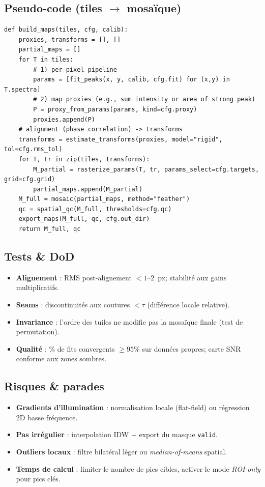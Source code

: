 \subsection{Pseudo-code (tiles $\rightarrow$ mosaïque)}
\begin{lstlisting}[basicstyle=\ttfamily\small]
def build_maps(tiles, cfg, calib):
    proxies, transforms = [], []
    partial_maps = []
    for T in tiles:
        # 1) per-pixel pipeline
        params = [fit_peaks(x, y, calib, cfg.fit) for (x,y) in T.spectra]
        # 2) map proxies (e.g., sum intensity or area of strong peak)
        P = proxy_from_params(params, kind=cfg.proxy)
        proxies.append(P)
    # alignment (phase correlation) -> transforms
    transforms = estimate_transforms(proxies, model="rigid", tol=cfg.rms_tol)
    for T, tr in zip(tiles, transforms):
        M_partial = rasterize_params(T, tr, params_select=cfg.targets, grid=cfg.grid)
        partial_maps.append(M_partial)
    M_full = mosaic(partial_maps, method="feather")
    qc = spatial_qc(M_full, thresholds=cfg.qc)
    export_maps(M_full, qc, cfg.out_dir)
    return M_full, qc
\end{lstlisting}

\subsection{Tests \& DoD}
\begin{itemize}[nosep]
\item \textbf{Alignement} : RMS post-alignement $< 1$--$2$~px; stabilité aux gains multiplicatifs.
\item \textbf{Seams} : discontinuités aux coutures $< \tau$ (différence locale relative).
\item \textbf{Invariance} : l'ordre des tuiles ne modifie pas la mosaïque finale (test de permutation).
\item \textbf{Qualité} : \% de fits convergents $\ge 95\%$ sur données propres; carte SNR conforme aux zones sombres.
\end{itemize}

\subsection{Risques \& parades}
\begin{itemize}[nosep]
\item \textbf{Gradients d'illumination} : normalisation locale (flat-field) ou régression 2D basse fréquence.
\item \textbf{Pas irrégulier} : interpolation IDW + export du masque \texttt{valid}.
\item \textbf{Outliers locaux} : filtre bilatéral léger ou \emph{median-of-means} spatial.
\item \textbf{Temps de calcul} : limiter le nombre de pics cibles, activer le mode \emph{ROI-only} pour pics clés.
\end{itemize}

